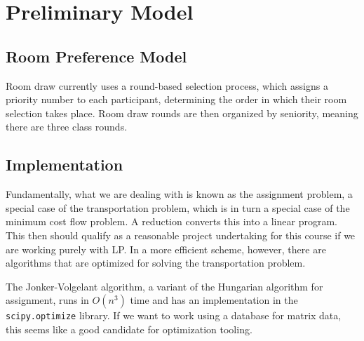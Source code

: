 \documentclass[12pt]{article}
\begin{document}
    \section*{Preliminary Model}
    \subsection*{Room Preference Model}
    Room draw currently uses a round-based selection process, which assigns a priority number to each participant, determining the order in which their room selection takes place. Room draw rounds are then organized by seniority, meaning there are three class rounds. 


    \subsection*{Implementation}
    Fundamentally, what we are dealing with is known as the assignment problem, a special case of the transportation problem, which is in turn a special case of the minimum cost flow problem. A reduction converts this into a linear program. This then should qualify as a reasonable project undertaking for this course if we are working purely with LP. In a more efficient scheme, however, there are algorithms that are optimized for solving the transportation problem. 

    The Jonker-Volgelant algorithm, a variant of the Hungarian algorithm for assignment, runs in $O(n^3)$ time and has an implementation in the \texttt{scipy.optimize} library. If we want to work using a database for matrix data, this seems like a good candidate for optimization tooling.
\end{document}
